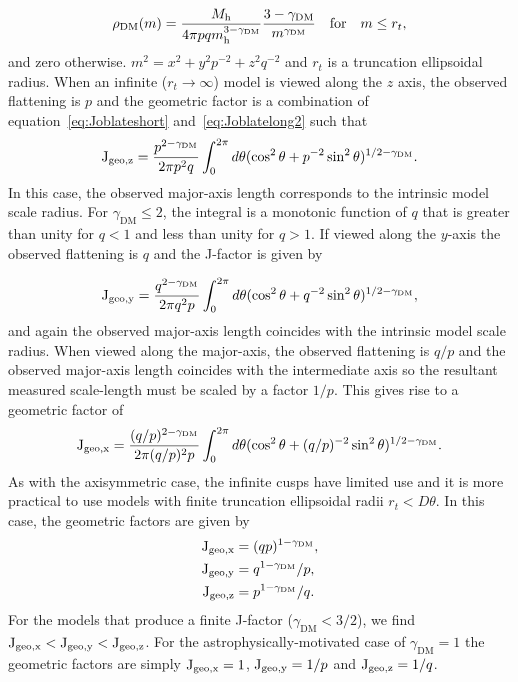 \documentclass[prd,twocolumn,showpacs,preprintnumbers,superscriptaddress,nofootinbib,amsmath,amssymb,nobalancelastpage]{revtex4}
\def\mh{m_{\rm h}}
\def\Mh{M_{\rm h}}
\def\rhoDM{{\rho_{\rm DM}}}
\def\rhoDM{{\rho_{\rm DM}}}
\newcommand{\Jf}{{\rm J}}
\begin{document}
\begin{equation}
\rhoDM(m) = {\Mh\over 4 \pi pq\mh^{3-\gamma_\mathrm{DM}}}{3 -\gamma_\mathrm{DM} \over m^{\gamma_\mathrm{DM}}}\quad \mathrm{for}\quad m\leq r_t,
\label{TriaxCusp}
\end{equation}
and zero otherwise. $m^2 = x^2 + y^2p^{-2} + z^2q^{-2}$ and $r_t$ is a truncation ellipsoidal radius.
%
When an infinite ($r_t\rightarrow\infty$) model is viewed along the $z$ axis, the observed flattening is $p$ and the geometric factor is a combination of equation~\eqref{eq:Joblateshort} and~\eqref{eq:Joblatelong2} such that
\begin{equation}
\Jf_{\rm geo,z} = {p^{2-\gamma_\mathrm{DM}}\over 2 \pi p^2 q} \int_0^{2\pi}d\theta (\cos^2\theta +
p^{-2}\sin^2\theta)^{1/2-\gamma_\mathrm{DM}}.
\end{equation}
In this case, the observed major-axis length corresponds to the intrinsic model scale radius. For $\gamma_\mathrm{DM}\leq2$, the integral is a monotonic function of $q$ that is greater than unity for $q<1$ and less than unity for $q>1$. If viewed along the $y$-axis the observed flattening is $q$ and the J-factor is given by

\begin{equation}
\Jf_{\rm geo,y} = {q^{2-\gamma_\mathrm{DM}}\over 2 \pi q^2 p} \int_0^{2\pi}d\theta (\cos^2\theta +
q^{-2}\sin^2\theta)^{1/2-\gamma_\mathrm{DM}},
\end{equation}
and again the observed major-axis length coincides with the intrinsic model scale radius. When viewed along the major-axis, the observed flattening is $q/p$ and the observed major-axis length coincides with the intermediate axis so the resultant measured scale-length must be scaled by a factor $1/p$. This gives rise to a geometric factor of
\begin{equation}
\Jf_{\rm geo,x} = {(q/p)^{2-\gamma_\mathrm{DM}}\over 2 \pi (q/p)^2 p} \int_0^{2\pi}d\theta (\cos^2\theta +
(q/p)^{-2}\sin^2\theta)^{1/2-\gamma_\mathrm{DM}}.
\end{equation}
As with the axisymmetric case, the infinite cusps have limited use and it is more practical to use models with finite truncation ellipsoidal radii $r_t<D\theta$. In this case, the geometric factors are given by
\begin{equation}
\begin{split}
\Jf_{\rm geo,x}&=(qp)^{1-\gamma_\mathrm{DM}},\\
\Jf_{\rm geo,y}&=q^{1-\gamma_\mathrm{DM}}/p, \\
\Jf_{\rm geo,z}&=p^{1-\gamma_\mathrm{DM}}/q.
\end{split}
\end{equation}
For the models that produce a finite J-factor ($\gamma_\mathrm{DM}<3/2$), we find $\Jf_{\rm geo,x}<\Jf_{\rm geo,y}<\Jf_{\rm geo,z}$. For the astrophysically-motivated case of $\gamma_\mathrm{DM}=1$ the geometric factors are simply $\Jf_{\rm geo,x}=1$, $\Jf_{\rm geo,y}=1/p$ and $\Jf_{\rm geo,z}=1/q$.
\end{document}
